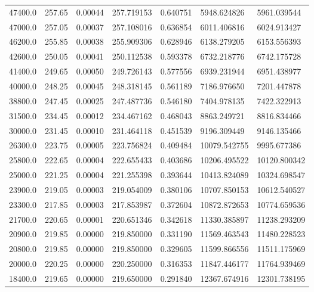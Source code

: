 \begin{tabular}{lllllll}
   47400.0 &   257.65 & 0.00044 &    257.719153 &          0.640751 &  5948.624826 &  5961.039544 \\
   47000.0 &   257.05 & 0.00037 &    257.108016 &          0.636854 &  6011.406816 &  6024.913427 \\
   46200.0 &   255.85 & 0.00038 &    255.909306 &          0.628946 &  6138.279205 &  6153.556393 \\
   42600.0 &   250.05 & 0.00041 &    250.112538 &          0.593378 &  6732.218776 &  6742.175728 \\
   41400.0 &   249.65 & 0.00050 &    249.726143 &          0.577556 &  6939.231944 &  6951.438977 \\
   40000.0 &   248.25 & 0.00045 &    248.318145 &          0.561189 &  7186.976650 &  7201.447878 \\
   38800.0 &   247.45 & 0.00025 &    247.487736 &          0.546180 &  7404.978135 &  7422.322913 \\
   31500.0 &   234.45 & 0.00012 &    234.467162 &          0.468043 &  8863.249721 &  8816.834466 \\
   30000.0 &   231.45 & 0.00010 &    231.464118 &          0.451539 &  9196.309449 &  9146.135466 \\
   26300.0 &   223.75 & 0.00005 &    223.756824 &          0.409484 & 10079.542755 &  9995.677386 \\
   25800.0 &   222.65 & 0.00004 &    222.655433 &          0.403686 & 10206.495522 & 10120.800342 \\
   25000.0 &   221.25 & 0.00004 &    221.255398 &          0.393644 & 10413.824089 & 10324.698547 \\
   23900.0 &   219.05 & 0.00003 &    219.054009 &          0.380106 & 10707.850153 & 10612.540527 \\
   23300.0 &   217.85 & 0.00003 &    217.853987 &          0.372604 & 10872.872653 & 10774.659536 \\
   21700.0 &   220.65 & 0.00001 &    220.651346 &          0.342618 & 11330.385897 & 11238.293209 \\
   20900.0 &   219.85 & 0.00000 &    219.850000 &          0.331190 & 11569.463543 & 11480.228523 \\
   20800.0 &   219.85 & 0.00000 &    219.850000 &          0.329605 & 11599.866556 & 11511.175969 \\
   20000.0 &   220.25 & 0.00000 &    220.250000 &          0.316353 & 11847.446177 & 11764.939469 \\
   18400.0 &   219.65 & 0.00000 &    219.650000 &          0.291840 & 12367.674916 & 12301.738195 \\

\end{tabular}

